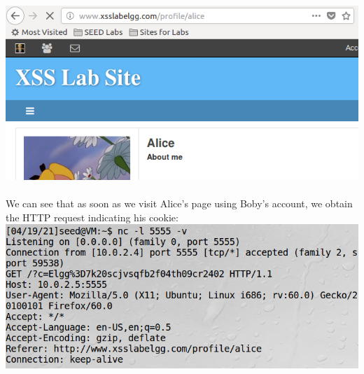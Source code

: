 \documentclass[a4paper]{article}
\begin{document}
\pagebreak
\includegraphics[scale=0.7]{2/9.png}\\\\
We can see that as soon as we visit Alice's page using Boby's account, we obtain the HTTP request indicating his cookie:\\
\includegraphics[scale=0.7]{2/10.png}\\\\
\end{document}
